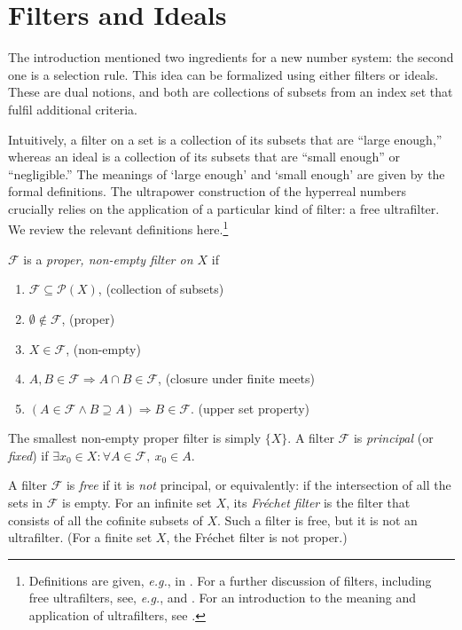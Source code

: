 
\section{Filters and Ideals}\label{sec:filters}
The introduction mentioned two ingredients for a new number system: the second one is a selection rule. This idea can be formalized using either filters or ideals. These are dual notions, and both are collections of subsets from an index set that fulfil additional criteria.

Intuitively, a filter on a set is a collection of its subsets that are ``large enough,'' whereas an ideal is a collection of its subsets that are ``small enough'' or ``negligible.'' The meanings of `large enough' and `small enough' are given by the formal definitions.
The ultrapower construction of the hyperreal numbers crucially relies on the application of a particular kind of filter: a free ultrafilter.
We review the relevant definitions here.\footnote{Definitions are given, \textit{e.g.}, in \citet[Ch.~5]{Schechter:1997}. For a further discussion of filters, including free ultrafilters, see, \textit{e.g.}, \citet[p.~18--21]{Goldblatt:1998} and \citet[section~1.1]{Cutland:1983}. For an introduction to the meaning and application of ultrafilters, see \citet{KomjathTotik:2008}.}

$\mathcal{F}$ is a \textit{proper, non-empty filter on $X$} if
\begin{enumerate}
\item[] $\mathcal{F} \subseteq \mathcal{P}(X)$, \hfill (collection of subsets)
\item[] $\emptyset \notin \mathcal{F}$, \hfill (proper)
\item[] $X \in \mathcal{F}$, \hfill (non-empty)
\item[] $A, B \in \mathcal{F} \Rightarrow A \cap B \in \mathcal{F}$, \hfill(closure under finite meets)
\item[] $(A \in \mathcal{F} \wedge B \supseteq A) \Rightarrow B \in \mathcal{F}.$ \hfill (upper set property)
\end{enumerate}
The smallest non-empty proper filter is simply $\{ X \}$. A filter $\mathcal{F}$ is \textit{principal} (or \textit{fixed}) if $\exists x_0 \in X: \forall A \in \mathcal{F}, \ x_0 \in A$.

A filter $\mathcal{F}$ is \textit{free} if it is \textit{not} principal, or equivalently: if the intersection of all the sets in $\mathcal{F}$ is empty. For an infinite set $X$, its \textit{Fr\'{e}chet filter} is the filter that consists of all the cofinite subsets of $X$. Such a filter is free, but it is not an ultrafilter. (For a finite set $X$, the Fr\'{e}chet filter is not proper.)

